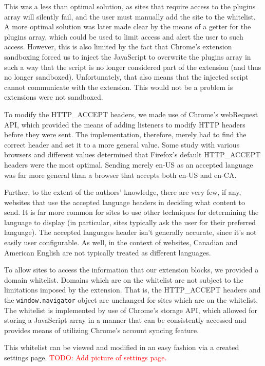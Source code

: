 \documentclass[12pt,a4paper]{article}
\begin{document}
This was a less than optimal solution, as sites that require access to the plugins array will silently fail, and the user must manually add the site to the whitelist. A more optimal solution was later made clear by the means of a getter for the plugins array, which could be used to limit access and alert the user to such access. However, this is also limited by the fact that Chrome's extension sandboxing forced us to inject the JavaScript to overwrite the plugins array in such a way that the script is no longer considered part of the extension (and thus no longer sandboxed). Unfortunately, that also means that the injected script cannot communicate with the extension. This would not be a problem is extensions were not sandboxed.

To modify the HTTP\_ACCEPT headers, we made use of Chrome's webRequest API\cite{webrequest}, which provided the means of adding listeners to modify HTTP headers before they were sent. The implementation, therefore, merely had to find the correct header and set it to a more general value. Some study with various browsers and different values determined that Firefox's default HTTP\_ACCEPT headers were the most optimal. Sending merely en-US as an accepted language was far more general than a browser that accepts both en-US and en-CA.

Further, to the extent of the authors' knowledge, there are very few, if any, websites that use the accepted language headers in deciding what content to send. It is far more common for sites to use other techniques for determining the language to display (in particular, sites typically ask the user for their preferred language). The accepted languages header isn't generally accurate, since it's not easily user configurable. As well, in the context of websites, Canadian and American English are not typically treated as different languages.

To allow sites to access the information that our extension blocks, we provided a domain whitelist. Domains which are on the whitelist are not subject to the limitations imposed by the extension. That is, the HTTP\_ACCEPT headers and the \texttt{window.navigator} object are unchanged for sites which are on the whitelist. The whitelist is implemented by use of Chrome's storage API\cite{storage}, which allowed for storing a JavaScript array in a manner that can be consistently accessed and provides means of utilizing Chrome's account syncing feature.

This whitelist can be viewed and modified in an easy fashion via a created settings page. \textcolor{red}{TODO: Add picture of settings page.}
\end{document}

